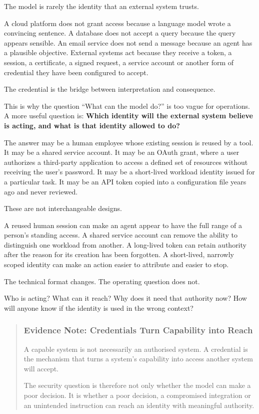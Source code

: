 The model is rarely the identity that an external system trusts.

A cloud platform does not grant access because a language model wrote a
convincing sentence. A database does not accept a query because the
query appears sensible. An email service does not send a message because
an agent has a plausible objective. External systems act because they
receive a token, a session, a certificate, a signed request, a service
account or another form of credential they have been configured to
accept.

The credential is the bridge between interpretation and consequence.

This is why the question ``What can the model do?'' is too vague for
operations. A more useful question is: \textbf{Which identity will the
external system believe is acting, and what is that identity allowed to
do?}

The answer may be a human employee whose existing session is reused by a
tool. It may be a shared service account. It may be an OAuth grant,
where a user authorizes a third-party application to access a defined
set of resources without receiving the user's password. It may be a
short-lived workload identity issued for a particular task. It may be an
API token copied into a configuration file years ago and never reviewed.

These are not interchangeable designs.

A reused human session can make an agent appear to have the full range
of a person's standing access. A shared service account can remove the
ability to distinguish one workload from another. A long-lived token can
retain authority after the reason for its creation has been forgotten. A
short-lived, narrowly scoped identity can make an action easier to
attribute and easier to stop.

The technical format changes. The operating question does not.

Who is acting? What can it reach? Why does it need that authority now?
How will anyone know if the identity is used in the wrong context?

\begin{quote}
\subsubsection{Evidence Note: Credentials Turn Capability into
Reach}\label{evidence-note-credentials-turn-capability-into-reach}

A capable system is not necessarily an authorised system. A credential
is the mechanism that turns a system's capability into access another
system will accept.

The security question is therefore not only whether the model can make a
poor decision. It is whether a poor decision, a compromised integration
or an unintended instruction can reach an identity with meaningful
authority.
\end{quote}


